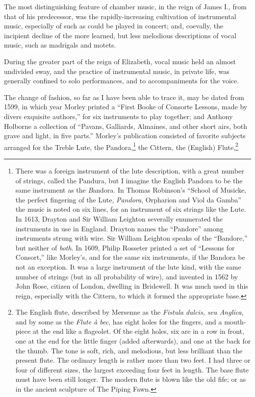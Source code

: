 

The most distinguishing feature of chamber music, in the reign of James I.,
from that of his predecessor, was the rapidly-increasing cultivation of instrumental
music, especially of such as could be played in concert; and, coevally, the incipient
decline of the more learned, but less melodious descriptions of vocal music,
such as madrigals and motets.

During the greater part of the reign of Elizabeth, vocal music held an almost
undivided sway, and the practice of instrumental music, in private life, was
generally confined to solo performances, and to accompaniments for the voice.

The change of fashion, so far as I have been able to trace it, may be dated from
1599, in which year Morley printed a “First Booke of Consorte Lessons, made
by divers exquisite authors,” for six instruments to play together; and Anthony
Holborne a collection of “Pavans, Galliards, Almaines, and other short airs, both
grave and light, in five parts.” Morley’s publication consisted of favorite
subjects arranged for the Treble Lute, the Pandora,\footnote{\textit{}
There was a foreign instrument of the lute description,
with a great number of strings, called the Pandura,
but I imagine the English Pandora to be the same instrument
as the \textit{B}andora. In Thomas Robinson’s “School
of Musicke, the perfect fingering of the Lute, \textit{Pandora},
Orpharion and Viol da Gamba” the music is noted on six
lines, for an instrument of six strings like the Lute. In
1613, Drayton and Sir William Leighton severally enumerated
the instruments in use in England. Drayton
names the “Pandore” among instruments strung with
wire. Sir William Leighton speaks of the “Bandore,”
but neither of \textit{both}. In 1609, Philip Rosseter printed a
set of “Lessons for Consort,” like Morley’s, and for the
same six instruments, if the Bandora be not an exception. 
It was a large instrument of the lute kind,
with the same number of strings (but in all probability of
wire), and invented in 1562 by John Rose, citizen of
London, dwelling in Bridewell. It was much used in
this reign, especially with the Cittern, to which it formed
the appropriate base.}
 the Cittern, the (English)
Flute,\footnote{\textit{}
The English flute, described by Mersenne as the
\textit{Fistula dulcis, seu Anglica}, and by some as the \textit{Flute
à bec}, has eight holes for the fingers, and a mouth-piece
at the end like a flageolet. Of the eight holes, six are in
a row in front, one at the end for the little finger
(added afterwards), and one at the back for the
thumb. The tone is soft, rich, and melodious, but less
brilliant than the present flute. The ordinary length is
rather more than two feet. I had three or four of different
sizes, the largest exceeding four feet in length. The
base flute must have been still longer. The modern
flute is blown like the old fife; or as in the ancient
sculpture of The Piping Fawn.}
